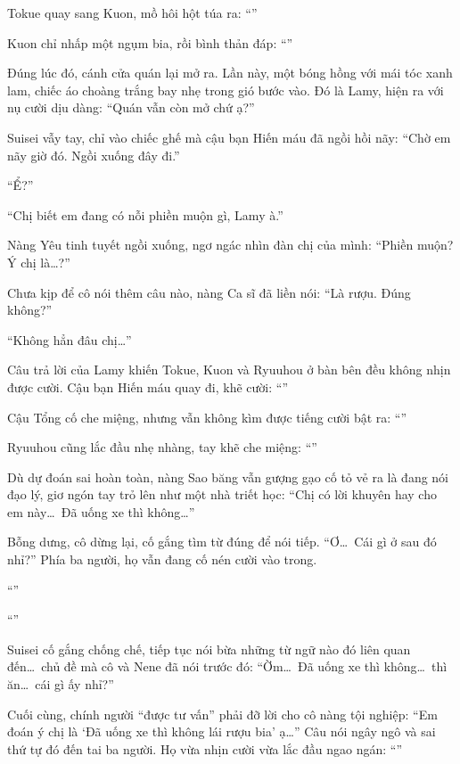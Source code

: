 \documentclass[../main.tex]{subfiles}
\begin{document}
Tokue quay sang Kuon, mồ hôi hột túa ra: ``''

Kuon chỉ nhấp một ngụm bia, rồi bình thản đáp: ``''

Đúng lúc đó, cánh cửa quán lại mở ra. Lần này, một bóng hồng với mái tóc xanh lam, chiếc áo choàng trắng bay nhẹ trong gió bước vào. Đó là Lamy, hiện ra với nụ cười dịu dàng: ``Quán vẫn còn mở chứ ạ?''


Suisei vẫy tay, chỉ vào chiếc ghế mà cậu bạn Hiến máu đã ngồi hồi nãy: ``Chờ em nãy giờ đó. Ngồi xuống đây đi.''

``Ể?''

``Chị biết em đang có nỗi phiền muộn gì, Lamy à.''

Nàng Yêu tinh tuyết ngồi xuống, ngơ ngác nhìn đàn chị của mình: ``Phiền muộn? Ý chị là\dots?''

Chưa kịp để cô nói thêm câu nào, nàng Ca sĩ đã liền nói: ``Là rượu. Đúng không?''

``Không hẳn đâu chị\dots''

Câu trả lời của Lamy khiến Tokue, Kuon và Ryuuhou ở bàn bên đều không nhịn được cười. Cậu bạn Hiến máu quay đi, khẽ cười: ``''

Cậu Tổng cố che miệng, nhưng vẫn không kìm được tiếng cười bật ra: ``''

Ryuuhou cũng lắc đầu nhẹ nhàng, tay khẽ che miệng: ``''

Dù dự đoán sai hoàn toàn, nàng Sao băng vẫn gượng gạo cố tỏ vẻ ra là đang nói đạo lý, giơ ngón tay trỏ lên như một nhà triết học: ``Chị có lời khuyên hay cho em này\dots\ Đã uống xe thì không\dots''

Bỗng dưng, cô dừng lại, cố gắng tìm từ đúng để nói tiếp. ``Ơ\dots\ Cái gì ở sau đó nhỉ?'' Phía ba người, họ vẫn đang cố nén cười vào trong.

``''

``''

Suisei cố gắng chống chế, tiếp tục nói bừa những từ ngữ nào đó liên quan đến\dots\ chủ đề mà cô và Nene đã nói trước đó: ``Ờm\dots\ Đã uống xe thì không\dots\ thì ăn\dots\ cái gì ấy nhỉ?''

Cuối cùng, chính người ``được tư vấn'' phải đỡ lời cho cô nàng tội nghiệp: ``Em đoán ý chị là `Đã uống xe thì không lái rượu bia' ạ\dots'' Câu nói ngây ngô và sai thứ tự đó đến tai ba người. Họ vừa nhịn cười vừa lắc đầu ngao ngán: ``''
\end{document}
